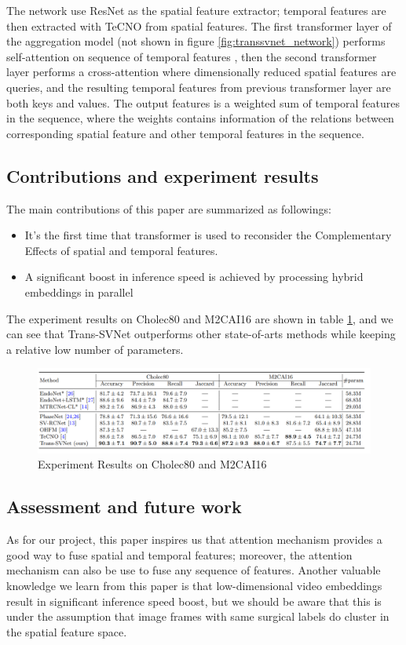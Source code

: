\documentclass[11pt]{article} \usepackage[top=1in, bottom=1in, left=1in, right=1in]{geometry}
\begin{document}
\vspace{0.25cm}
\noindent
The network use ResNet as the spatial feature extractor; temporal features are then extracted with TeCNO from spatial features. The first transformer layer of the aggregation model (not shown in figure \ref{fig:transsvnet_network}) performs self-attention on sequence of temporal features , then the second transformer layer performs a cross-attention where dimensionally reduced spatial features are queries, and the resulting temporal features from previous transformer layer are both keys and values. The output features is a weighted sum of temporal features in the sequence, where the weights contains information of the relations between corresponding spatial feature and other temporal features in the sequence.

\subsection{Contributions and experiment results}
The main contributions of this paper are summarized as followings:
\begin{itemize}
  \item It's the first time that transformer is used to reconsider the Complementary Effects of spatial and temporal features.
  \item A significant boost in inference speed is achieved by processing hybrid embeddings in parallel
\end{itemize}
The experiment results on Cholec80 and M2CAI16 are shown in table \ref{fig:transsvnet_result}, and we can see that Trans-SVNet outperforms other state-of-arts methods while keeping a relative low number of parameters.
\begin{figure}[H]
  \includegraphics[width=\textwidth]{trans_svnet_3.png}
  \centering
  \caption{Experiment Results on Cholec80 and M2CAI16}
  \label{fig:transsvnet_result}
\end{figure}

\subsection{Assessment and future work}
As for our project, this paper inspires us that attention mechanism provides a good way to fuse spatial and temporal features; moreover, the attention mechanism can also be use to fuse any sequence of features. Another valuable knowledge we learn from this paper is that low-dimensional video embeddings result in significant inference speed boost, but we should be aware that this is under the assumption that image frames with same surgical labels do cluster in the spatial feature space.
\end{document}
